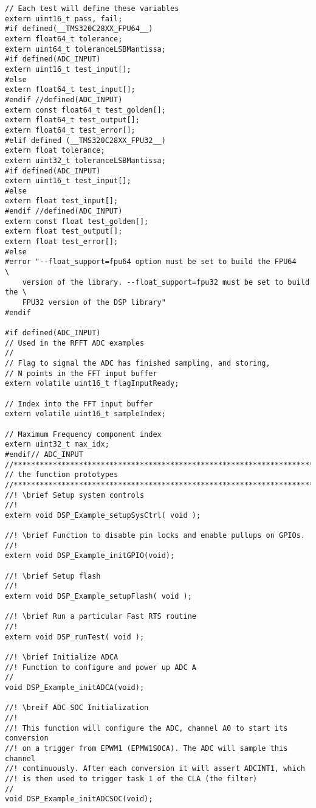\begin{lstlisting}[caption=\raggedright{mcu-libs/RLS.h}, frame=single]
// Each test will define these variables
extern uint16_t pass, fail;
#if defined(__TMS320C28XX_FPU64__)
extern float64_t tolerance;
extern uint64_t toleranceLSBMantissa;
#if defined(ADC_INPUT)
extern uint16_t test_input[];
#else
extern float64_t test_input[];
#endif //defined(ADC_INPUT)
extern const float64_t test_golden[];
extern float64_t test_output[];
extern float64_t test_error[];
#elif defined (__TMS320C28XX_FPU32__)
extern float tolerance;
extern uint32_t toleranceLSBMantissa;
#if defined(ADC_INPUT)
extern uint16_t test_input[];
#else
extern float test_input[];
#endif //defined(ADC_INPUT)
extern const float test_golden[];
extern float test_output[];
extern float test_error[];
#else
#error "--float_support=fpu64 option must be set to build the FPU64        \
    version of the library. --float_support=fpu32 must be set to build the \
    FPU32 version of the DSP library"
#endif

#if defined(ADC_INPUT)
// Used in the RFFT ADC examples
//
// Flag to signal the ADC has finished sampling, and storing, 
// N points in the FFT input buffer
extern volatile uint16_t flagInputReady;

// Index into the FFT input buffer
extern volatile uint16_t sampleIndex;

// Maximum Frequency component index
extern uint32_t max_idx;
#endif// ADC_INPUT
//*****************************************************************************
// the function prototypes
//*****************************************************************************
//! \brief Setup system controls
//! 
extern void DSP_Example_setupSysCtrl( void );

//! \brief Function to disable pin locks and enable pullups on GPIOs.
//!
extern void DSP_Example_initGPIO(void);

//! \brief Setup flash
//! 
extern void DSP_Example_setupFlash( void );

//! \brief Run a particular Fast RTS routine
//! 
extern void DSP_runTest( void );

//! \brief Initialize ADCA
//! Function to configure and power up ADC A
//
void DSP_Example_initADCA(void);

//! \breif ADC SOC Initialization
//!
//! This function will configure the ADC, channel A0 to start its conversion
//! on a trigger from EPWM1 (EPMW1SOCA). The ADC will sample this channel
//! continuously. After each conversion it will assert ADCINT1, which
//! is then used to trigger task 1 of the CLA (the filter)
//
void DSP_Example_initADCSOC(void);


\end{lstlisting}
